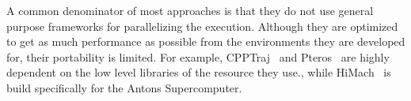 



A common denominator of most approaches is that they do not use general purpose
frameworks for parallelizing the execution. Although they are optimized to get
as much performance as possible from the environments they are developed for,
their portability is limited. For example, CPPTraj~\cite{roe2018parallelization}
and Pteros~\cite{yesylevskyy2015pteros} are highly dependent on the low level
libraries of the resource they use., while HiMach~\cite{tiankai2008scalable} is
build specifically for the Antons Supercomputer.

